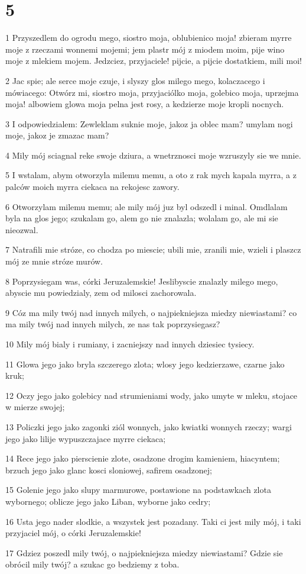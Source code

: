 \chapter{5}

\par 1 Przyszedlem do ogrodu mego, siostro moja, oblubienico moja! zbieram myrre moje z rzeczami wonnemi mojemi; jem plastr mój z miodem moim, pije wino moje z mlekiem mojem. Jedzciez, przyjaciele! pijcie, a pijcie dostatkiem, mili moi!
\par 2 Jac spie; ale serce moje czuje, i slyszy glos milego mego, kolaczacego i mówiacego: Otwórz mi, siostro moja, przyjaciólko moja, golebico moja, uprzejma moja! albowiem glowa moja pelna jest rosy, a kedzierze moje kropli nocnych.
\par 3 I odpowiedzialem: Zewleklam suknie moje, jakoz ja oblec mam? umylam nogi moje, jakoz je zmazac mam?
\par 4 Mily mój sciagnal reke swoje dziura, a wnetrznosci moje wzruszyly sie we mnie.
\par 5 I wstalam, abym otworzyla milemu memu, a oto z rak mych kapala myrra, a z palców moich myrra ciekaca na rekojesc zawory.
\par 6 Otworzylam milemu memu; ale mily mój juz byl odszedl i minal. Omdlalam byla na glos jego; szukalam go, alem go nie znalazla; wolalam go, ale mi sie nieozwal.
\par 7 Natrafili mie stróze, co chodza po miescie; ubili mie, zranili mie, wzieli i plaszcz mój ze mnie stróze murów.
\par 8 Poprzysiegam was, córki Jeruzalemskie! Jeslibyscie znalazly milego mego, abyscie mu powiedzialy, zem od milosci zachorowala.
\par 9 Cóz ma mily twój nad innych milych, o najpiekniejsza miedzy niewiastami? co ma mily twój nad innych milych, ze nas tak poprzysiegasz?
\par 10 Mily mój bialy i rumiany, i zacniejszy nad innych dziesiec tysiecy.
\par 11 Glowa jego jako bryla szczerego zlota; wlosy jego kedzierzawe, czarne jako kruk;
\par 12 Oczy jego jako golebicy nad strumieniami wody, jako umyte w mleku, stojace w mierze swojej;
\par 13 Policzki jego jako zagonki ziól wonnych, jako kwiatki wonnych rzeczy; wargi jego jako lilije wypuszczajace myrre ciekaca;
\par 14 Rece jego jako pierscienie zlote, osadzone drogim kamieniem, hiacyntem; brzuch jego jako glanc kosci sloniowej, safirem osadzonej;
\par 15 Golenie jego jako slupy marmurowe, postawione na podstawkach zlota wybornego; oblicze jego jako Liban, wyborne jako cedry;
\par 16 Usta jego nader slodkie, a wszystek jest pozadany. Taki ci jest mily mój, i taki przyjaciel mój, o córki Jeruzalemskie!
\par 17 Gdziez poszedl mily twój, o najpiekniejsza miedzy niewiastami? Gdzie sie obrócil mily twój? a szukac go bedziemy z toba.

